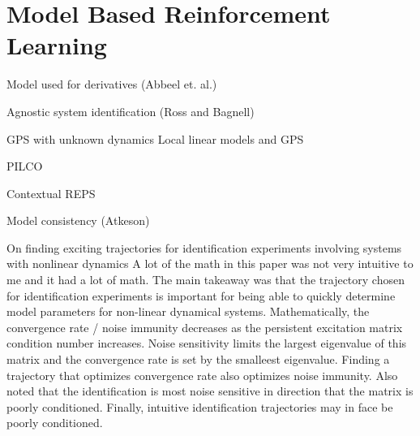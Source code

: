 \documentclass[12 pt]{article}
\begin{document}
\section{Model Based Reinforcement Learning}

Model used for derivatives (Abbeel et. al.)

Agnostic system identification (Ross and Bagnell)

GPS with unknown dynamics \cite{levine2014learning}
Local linear models and GPS \cite{levine2015learning}

PILCO \cite{deisenroth2011pilco}

Contextual REPS \cite{kupcsik2013data}

Model consistency (Atkeson)

On finding exciting trajectories for identification experiments involving systems with nonlinear dynamics \cite{armstrong1987find}
A lot of the math in this paper was not very intuitive to me and it had a lot of math. The main takeaway was that the trajectory chosen for identification experiments is important for being able to quickly determine model parameters for non-linear dynamical systems. Mathematically, the convergence rate / noise immunity decreases as the persistent excitation matrix condition number increases. Noise sensitivity limits the largest eigenvalue of this matrix and the convergence rate is set by the smalleest eigenvalue. Finding a trajectory that optimizes convergence rate also optimizes noise immunity. Also noted that the identification is most noise sensitive in direction that the matrix is poorly conditioned. Finally, intuitive identification trajectories may in face be poorly conditioned.




\end{document}
